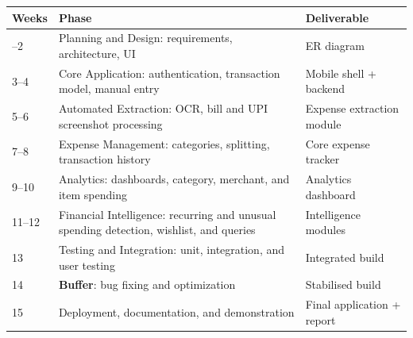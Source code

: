 \documentclass[11pt,a4paper]{article}
\begin{document}
{\small
\renewcommand{\arraystretch}{1.15}
\setlength{\tabcolsep}{5pt}

\begin{center}

\begin{tabular}{
    @{}
    >{\raggedright\arraybackslash}p{1.5cm}
    >{\raggedright\arraybackslash}p{9.3cm}
    >{\raggedright\arraybackslash}p{3.6cm}
    @{}
}

\hline

\rowcolor{rowshade}
\textbf{Weeks} & \textbf{Phase} & \textbf{Deliverable} \\

\hline

1--2 &
Planning and Design: requirements, architecture, UI &
ER diagram \\

\hline

3--4 &
Core Application: authentication, transaction model, manual entry &
Mobile shell + backend \\

\hline

5--6 &
Automated Extraction: OCR, bill and UPI screenshot processing &
Expense extraction module \\

\hline

7--8 &
Expense Management: categories, splitting, transaction history &
Core expense tracker \\

\hline

9--10 &
Analytics: dashboards, category, merchant, and item spending &
Analytics dashboard \\

\hline

11--12 &
Financial Intelligence: recurring and unusual spending detection,
wishlist, and queries &
Intelligence modules \\

\hline

13 &
Testing and Integration: unit, integration, and user testing &
Integrated build \\

\hline

14 &
\textbf{Buffer}: bug fixing and optimization &
Stabilised build \\

\hline

15 &
Deployment, documentation, and demonstration &
Final application + report \\

\hline

\end{tabular}

\end{center}
}
\end{document}
